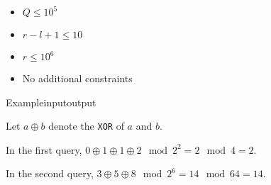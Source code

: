 \documentclass[11pt,a4paper,oneside]{article}
\begin{document}
\begin{itemize}
\item $Q \leq 10^5$ 
\item $r - l + 1 \leq 10$
\end{itemize}

\newpage
{}
\begin{itemize}
\item $r \leq 10^6$
\end{itemize}

\begin{itemize}
\item No additional constraints
\end{itemize}


\begin{examples}{Example}{input}{output}
%
\end{examples}


Let $a \oplus b$ denote the \texttt{XOR} of $a$ and $b$.

In the first query, $0 \oplus 1 \oplus 1 \oplus 2 \mod 2^2 = 2 \mod 4 = 2$.

In the second query, $3 \oplus 5 \oplus 8 \mod 2^6 = 14 \mod 64 = 14$.
\end{document}
